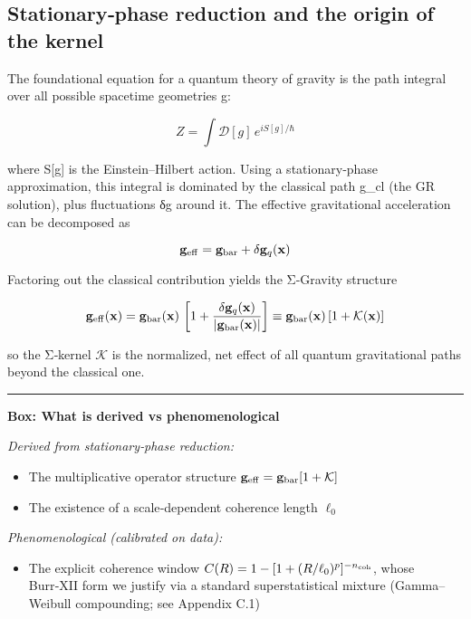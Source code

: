 \documentclass[11pt,a4paper]{article}
\begin{document}
\subsection{Stationary‑phase reduction and the origin of the kernel}


The foundational equation for a quantum theory of gravity is the path integral over all possible spacetime geometries g:


\begin{equation}
Z = \int \mathcal{D}[g] \, e^{iS[g]/\hbar}
\end{equation}


where S[g] is the Einstein–Hilbert action. Using a stationary‑phase approximation, this integral is dominated by the classical path g\_cl (the GR solution), plus fluctuations δg around it. The effective gravitational acceleration can be decomposed as


\begin{equation}
\mathbf{g}_{\rm eff} = \mathbf{g}_{\rm bar} + \delta\mathbf{g}_q(\mathbf{x})
\end{equation}


Factoring out the classical contribution yields the Σ‑Gravity structure


\begin{equation}
\mathbf{g}_{\rm eff}(\mathbf{x}) = \mathbf{g}_{\rm bar}(\mathbf{x})\,\left[1 + \frac{\delta\mathbf{g}_q(\mathbf{x})}{\lvert\mathbf{g}_{\rm bar}(\mathbf{x})\rvert}\right] \equiv \mathbf{g}_{\rm bar}(\mathbf{x})\,[1+\mathcal{K}(\mathbf{x})]
\end{equation}


so the Σ‑kernel $\mathcal{K}$ is the normalized, net effect of all quantum gravitational paths beyond the classical one.


\medskip\hrule\medskip


\textbf{Box: What is derived vs phenomenological}


\textit{Derived from stationary‑phase reduction:}

\begin{itemize}
\item The multiplicative operator structure $\mathbf{g}_{\rm eff}=\mathbf{g}_{\rm bar}[1+\mathcal{K}]$
\item The existence of a scale‑dependent coherence length $\ell_0$
\end{itemize}


\textit{Phenomenological (calibrated on data):}

\begin{itemize}
\item The explicit coherence window $C(R)=1-[1+(R/\ell_0)^p]^{-n_{\rm coh}}$, whose Burr‑XII form we justify via a standard superstatistical mixture (Gamma–Weibull compounding; see Appendix C.1)
\end{itemize}
\end{document}

